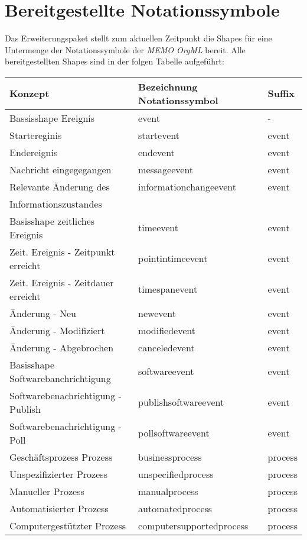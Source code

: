 \documentclass[12pt, a4paper]{article}
\begin{document}
\section{Bereitgestellte Notationssymbole}
\label{sec:Notationssymbole}
Das Erweiterungspaket stellt zum aktuellen Zeitpunkt die Shapes für eine Untermenge der Notationssymbole der \textit{MEMO OrgML} bereit. Alle bereitgestellten Shapes sind in der folgen Tabelle aufgeführt:
\begin{longtable}{lll}
        \toprule
        Konzept & Bezeichnung Notationssymbol & Suffix\\
        \midrule
        Bassisshape Ereignis & event & - \\
        Startereginis & startevent & event \\
        Endereignis & endevent & event \\
        Nachricht eingegegangen & messageevent & event \\
        Relevante Änderung des & informationchangeevent & event \\
        Informationszustandes & & \\
        Basisshape zeitliches Ereignis & timeevent & event \\
        Zeit. Ereignis - Zeitpunkt erreicht & pointintimeevent & event \\
        Zeit. Ereignis - Zeitdauer erreicht & timespanevent & event \\
        Änderung - Neu & newevent & event \\
        Änderung - Modifiziert & modifiedevent & event \\
        Änderung - Abgebrochen & canceledevent & event \\
        Basisshape Softwarebanchrichtigung & softwareevent & event \\
        Softwarebenachrichtigung - Publish & publishsoftwareevent & event \\
        Softwarebenachrichtigung - Poll & pollsoftwareevent & event \\
        Geschäftsprozess Prozess & businessprocess & process \\
        Unspezifizierter Prozess & unspecifiedprocess & process \\
        Manueller Prozess & manualprocess & process \\
        Automatisierter Prozess & automatedprocess & process \\
        Computergestützter Prozess & computersupportedprocess & process \\

\end{longtable}
\end{document}
